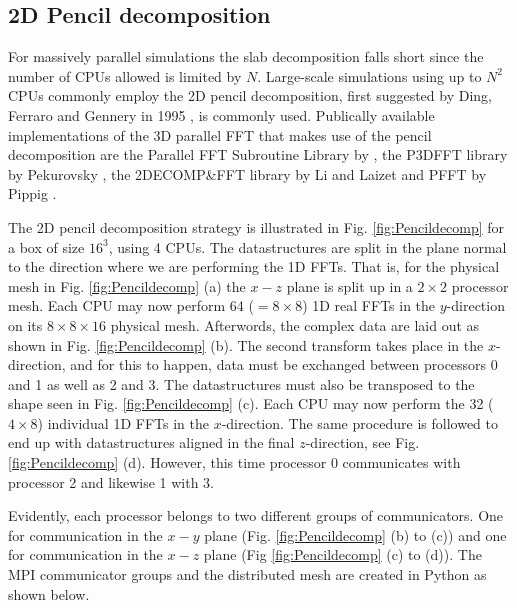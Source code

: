 \documentclass[11pt, oneside]{article}
\begin{document}
\subsection{2D Pencil decomposition}
\label{pencil2D}

For massively parallel simulations the slab decomposition falls short since the number of CPUs allowed is limited by $N$. Large-scale simulations using up to $N^2$ CPUs commonly employ the 2D pencil decomposition, first suggested by Ding, Ferraro and Gennery in 1995 \cite{Ding95}, is commonly used. Publically available implementations of the 3D parallel FFT that makes use of the pencil decomposition are the Parallel FFT Subroutine Library by \cite{PlimptonFFT}, the P3DFFT library by Pekurovsky \cite{p3dfft, Pekurovsky2012}, the 2DECOMP\&FFT library by Li and Laizet \cite{Li2010} and PFFT by Pippig \cite{Pi13}.

The 2D pencil decomposition strategy is illustrated in Fig. \ref{fig:Pencildecomp} for a box of size $16^3$, using 4 CPUs. The datastructures are split in the plane normal to the direction where we are performing the 1D FFTs. That is, for the physical mesh in Fig. \ref{fig:Pencildecomp} (a) the $x-z$ plane is split up in a $2\times2$ processor mesh. Each CPU may now perform 64 ($= 8 \times 8$) 1D real FFTs in the $y$-direction on its $8 \times 8 \times 16$ physical mesh. Afterwords, the complex data are laid out as shown in Fig. \ref{fig:Pencildecomp} (b). The second transform takes place in the $x$-direction, and for this to happen, data must be exchanged between processors 0 and 1 as well as 2 and 3. The datastructures must also be transposed to the shape seen in Fig. \ref{fig:Pencildecomp} (c). Each CPU may now perform the 32 ($4 \times 8$) individual 1D FFTs in the $x$-direction. The same procedure is followed to end up with datastructures aligned in the final $z$-direction, see Fig. \ref{fig:Pencildecomp} (d). However, this time processor 0 communicates with processor 2 and likewise 1 with 3.

Evidently, each processor belongs to two different groups of communicators. One for communication in the $x-y$ plane (Fig. \ref{fig:Pencildecomp} (b) to (c)) and one for communication in the $x-z$ plane (Fig \ref{fig:Pencildecomp} (c) to (d)). The MPI communicator groups and the distributed mesh are created in Python as shown below.
\end{document}

